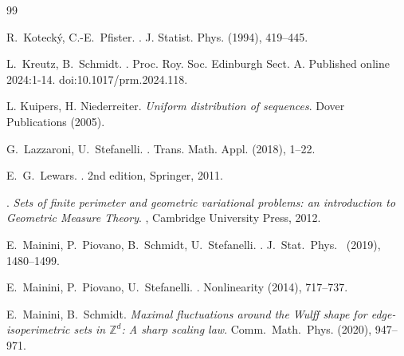 \documentclass[reqno]{amsart}
\theoremstyle{plain}
\theoremstyle{definition}
\numberwithin{equation}{section}
\newcommand{\Z}{\mathbb{Z}}
\begin{document}
\begin{thebibliography}{99}
 

   


 



%
%
%
% 

  
  {\sc R.~Koteck\'y, C.-E.~Pfister}.
  .
  \newblock J. Statist. Phys.
   (1994),   419--445.

  
  {\sc L.~Kreutz, B.~Schmidt}.
  .
  \newblock Proc. Roy. Soc. Edinburgh Sect. A. Published online 2024:1-14. doi:10.1017/prm.2024.118.
  
   
  {\sc L. Kuipers, H. Niederreiter}. {\em Uniform distribution of
    sequences}. Dover Publications (2005).  
  
  
  
  {\sc G.~Lazzaroni, U.~Stefanelli}.
  .
  \newblock Trans. Math. Appl.
   (2018),   1--22.
  

{\sc E.~G.~Lewars}.
. 2nd edition, Springer, 2011.

 

.
\newblock \emph{Sets of finite perimeter and geometric variational problems: an introduction to Geometric Measure Theory}.
, Cambridge University Press, 2012.




{\sc E.~Mainini, P.~Piovano, B.~Schmidt, U.~Stefanelli}. 
. 
\newblock J.\ Stat.\ Phys.\
 (2019), 1480--1499.


 
 

{\sc E.~Mainini, P.~Piovano, U.~Stefanelli}. 
. 
\newblock Nonlinearity
 (2014), 717--737.
 
 
 
 {\sc  E.~Mainini, B.~Schmidt}. {\em 
Maximal fluctuations around the Wulff shape for edge-isoperimetric sets in $\Z^d$: A sharp scaling law}.
 \newblock  Comm.\ Math.\ Phys. 
 (2020),  947--971.



\end{thebibliography}
\end{document}

